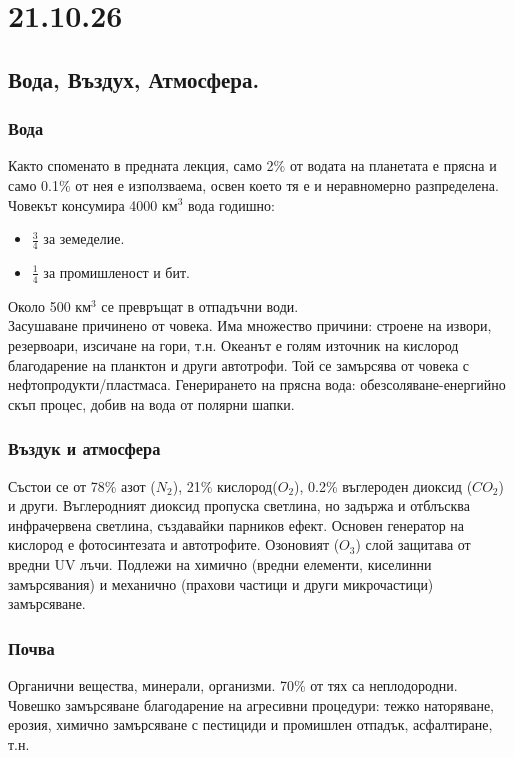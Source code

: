 \documentclass[12pt, a4paper]{article}
\begin{document}
{\centering\section*{21.10.26}}
\subsection*{Вода, Въздух, Атмосфера.}
\subsubsection*{Вода}
Както споменато в предната лекция, само 2\% от водата на планетата е прясна и само 0.1\% от нея е използваема, освен което тя е и неравномерно разпределена. Човекът консумира 4000 км$^3$ вода годишно:
\begin{itemize}
	\item $\frac{3}{4}$ за земеделие.
	\item $\frac{1}{4}$ за промишленост и бит.
\end{itemize}
Около 500 км$^3$ се превръщат в отпадъчни води.\\

Засушаване причинено от човека. Има множество причини: строене на извори, резервоари, изсичане на гори, т.н. Океанът е голям източник на кислород благодарение на планктон и други автотрофи. Той се замърсява от човека с нефтопродукти/пластмаса. Генерирането на прясна вода: обезсоляване-енергийно скъп процес, добив на вода от полярни шапки. 

\subsubsection*{Въздук и атмосфера}

Състои се от 78\% азот ($N_2$), 21\% кислород($O_2$), 0.2\% въглероден диоксид ($CO_2$) и други. Въглеродният диоксид пропуска светлина, но задържа и отблъсква инфрачервена светлина, създавайки парников ефект. Основен генератор на кислород е фотосинтезата и автотрофите. Озоновият ($O_3$) слой защитава от вредни UV лъчи. Подлежи на химично (вредни елементи, киселинни замърсявания) и механично (прахови частици и други микрочастици) замърсяване.

\subsubsection*{Почва}

Органични вещества, минерали, организми. 70\% от тях са неплодородни. Човешко замърсяване благодарение на агресивни процедури: тежко наторяване, ерозия, химично замърсяване с пестициди и промишлен отпадък, асфалтиране, т.н.
\end{document}
